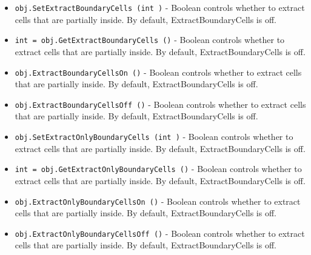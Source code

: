 \begin{itemize}
\item  \verb|obj.SetExtractBoundaryCells (int )| -  Boolean controls whether to extract cells that are partially inside.
 By default, ExtractBoundaryCells is off.

\item  \verb|int = obj.GetExtractBoundaryCells ()| -  Boolean controls whether to extract cells that are partially inside.
 By default, ExtractBoundaryCells is off.

\item  \verb|obj.ExtractBoundaryCellsOn ()| -  Boolean controls whether to extract cells that are partially inside.
 By default, ExtractBoundaryCells is off.

\item  \verb|obj.ExtractBoundaryCellsOff ()| -  Boolean controls whether to extract cells that are partially inside.
 By default, ExtractBoundaryCells is off.

\item  \verb|obj.SetExtractOnlyBoundaryCells (int )| -  Boolean controls whether to extract cells that are partially inside.
 By default, ExtractBoundaryCells is off.

\item  \verb|int = obj.GetExtractOnlyBoundaryCells ()| -  Boolean controls whether to extract cells that are partially inside.
 By default, ExtractBoundaryCells is off.

\item  \verb|obj.ExtractOnlyBoundaryCellsOn ()| -  Boolean controls whether to extract cells that are partially inside.
 By default, ExtractBoundaryCells is off.

\item  \verb|obj.ExtractOnlyBoundaryCellsOff ()| -  Boolean controls whether to extract cells that are partially inside.
 By default, ExtractBoundaryCells is off.

\end{itemize}
